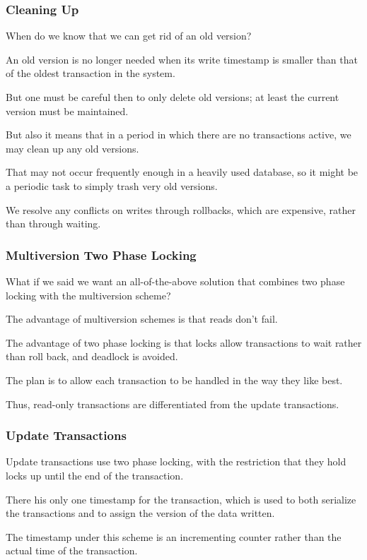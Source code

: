 \begin{frame}
\frametitle{Cleaning Up}

When do we know that we can get rid of an old version? 

An old version is no longer needed when its write timestamp is smaller than that of the oldest transaction in the system. 

But one must be careful then to only delete old versions; at least the current version must be maintained. 

But also it means that in a period in which there are no transactions active, we may clean up any old versions. 

That may not occur frequently enough in a heavily used database, so it might be a periodic task to simply trash very old versions.

We resolve any conflicts on writes through rollbacks, which are expensive, rather than through waiting.

\end{frame}

\begin{frame}
\frametitle{Multiversion Two Phase Locking}

What if we said we want an all-of-the-above solution that combines two phase locking with the multiversion scheme? 

The advantage of multiversion schemes is that reads don't fail. 

The advantage of two phase locking is that locks allow transactions to wait rather than roll back, and deadlock is avoided. 

The plan is to allow each transaction to be handled in the way they like best. 

Thus, read-only transactions are differentiated from the update transactions.


\end{frame}


\begin{frame}
\frametitle{Update Transactions}
Update transactions use two phase locking, with the restriction that they hold locks up until the end of the transaction. 

There his only one timestamp for the transaction, which is used to both serialize the transactions and to assign the version of the data written.

The timestamp under this scheme is an incrementing counter rather than the actual time of the transaction. 

\end{frame}

